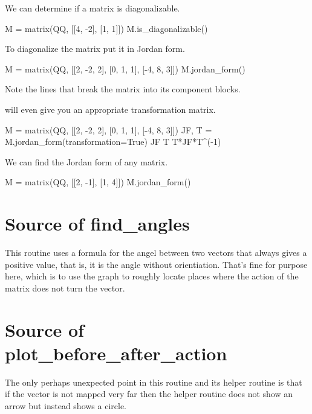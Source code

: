 We can determine if a matrix is diagonalizable.
\begin{sageoutput}
M =  matrix(QQ, [[4, -2], [1, 1]])  
M.is_diagonalizable()
\end{sageoutput}
\noindent
To diagonalize the matrix put it in Jordan form.
\begin{sageoutput}
M =  matrix(QQ, [[2, -2, 2], [0, 1, 1], [-4, 8, 3]])  
M.jordan_form()
\end{sageoutput}
\noindent 
Note the \inlinecode{-+-+-} lines that break the matrix into its component
blocks.

\Sage{} will even give you an appropriate transformation matrix.
\begin{sageoutput}[d,0,1]
M =  matrix(QQ, [[2, -2, 2], [0, 1, 1], [-4, 8, 3]])  
JF, T = M.jordan_form(transformation=True)
JF
T
T*JF*T^(-1)
\end{sageoutput}

We can find the Jordan form of any matrix.
\begin{sageoutput}
M =  matrix(QQ, [[2, -1], [1, 4]])  
M.jordan_form()
\end{sageoutput}



\section{Source of find\_angles}
This routine uses a formula for the angel between two vectors that 
always gives a positive value, that is, it is the angle without orientiation.
That's fine for purpose here, which is to use the graph to 
roughly locate places where the action of the matrix does not turn the
vector. 



\section{Source of plot\_before\_after\_action}
The only perhaps unexpected point in this routine and its helper routine
is that if the vector is not mapped very far then the helper
routine does not show an arrow but instead shows a circle.



\endinput

TODO

1) Does python intro show 
   > x, y = 5, 7
construct?